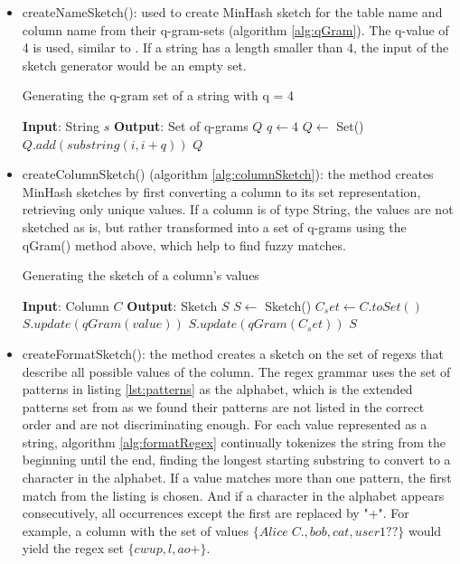 \begin{itemize}
    \item createNameSketch(): used to create MinHash sketch for the table name and column name from their q-gram-sets (algorithm \ref{alg:qGram}). The q-value of 4 is used, similar to \cite{d3l}. If a string has a length smaller than 4, the input of the sketch generator would be an empty set.

\begin{algorithm}
    \caption{Generating the q-gram set of a string with q = 4}
    \label{alg:qGram}
    \begin{algorithmic}[1]
\STATE \textbf{Input}: String $s$
\STATE \textbf{Output}: Set of q-grams $Q$
\STATE $q \gets 4$
\STATE $Q \gets$ Set()
\STATE $Q.add(substring(i, i + q))$
\ENDFOR
\RETURN $Q$
    \end{algorithmic}
\end{algorithm}
    
    \item createColumnSketch() (algorithm \ref{alg:columnSketch}): the method creates MinHash sketches by first converting a column to its set representation, retrieving only unique values. If a column is of type String, the values are not sketched as is, but rather transformed into a set of q-grams using the qGram() method above, which help to find fuzzy matches.

\begin{algorithm}
    \caption{Generating the sketch of a column's values}
    \label{alg:columnSketch}
    \begin{algorithmic}[1]
\STATE \textbf{Input}: Column $C$
\STATE \textbf{Output}: Sketch $S$
\STATE $S \gets$ Sketch()
\STATE $C_set \gets C.toSet()$
\STATE $S.update(qGram(value))$
\ENDFOR
\ELSE
\STATE $S.update(qGram(C_set))$
\ENDIF
\RETURN $S$
    \end{algorithmic}
\end{algorithm}
    
    \item createFormatSketch(): the method creates a sketch on the set of regexs that describe all possible values of the column. The regex grammar uses the set of patterns in listing \ref{lst:patterns} as the alphabet, which is the extended patterns set from \cite{d3l} as we found their patterns are not listed in the correct order and are not discriminating enough. For each value represented as a string, algorithm \ref{alg:formatRegex} continually tokenizes the string from the beginning until the end, finding the longest starting substring to convert to a character in the alphabet. If a value matches more than one pattern, the first match from the listing is chosen. And if a character in the alphabet appears consecutively, all occurrences except the first are replaced by "+". For example, a column with the set of values \(\{Alice\;C., bob, cat, user1??\}\) would yield the regex set \(\{cwup, l, ao+\}\). 


\end{itemize}
